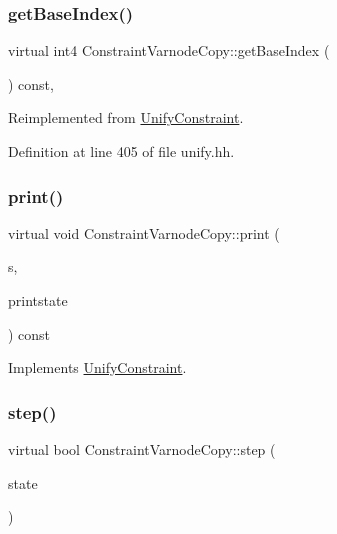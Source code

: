 \subsubsection{\texorpdfstring{getBaseIndex()}{getBaseIndex()}}
{\footnotesize\ttfamily virtual int4 Constraint\+Varnode\+Copy\+::get\+Base\+Index (\begin{DoxyParamCaption}\item[{void}]{ }\end{DoxyParamCaption}) const\hspace{0.3cm}{\ttfamily [inline]}, {\ttfamily [virtual]}}



Reimplemented from \mbox{\hyperlink{class_unify_constraint_a44f0164f38ac1fdc44fc73ebe7678de1}{Unify\+Constraint}}.



Definition at line 405 of file unify.\+hh.

\mbox{\label{class_constraint_varnode_copy_a6341d22e7011e5bba4c1ed7aa4d0b657}} 
\subsubsection{\texorpdfstring{print()}{print()}}
{\footnotesize\ttfamily virtual void Constraint\+Varnode\+Copy\+::print (\begin{DoxyParamCaption}\item[{ostream \&}]{s,  }\item[{\mbox{\hyperlink{class_unify_c_printer}{Unify\+C\+Printer}} \&}]{printstate }\end{DoxyParamCaption}) const\hspace{0.3cm}{\ttfamily [virtual]}}



Implements \mbox{\hyperlink{class_unify_constraint_a774f6a611a96384766cb8e8d8f5ff41f}{Unify\+Constraint}}.

\mbox{\label{class_constraint_varnode_copy_afa111c6ea8baf57393ba9d503612e036}} 
\subsubsection{\texorpdfstring{step()}{step()}}
{\footnotesize\ttfamily virtual bool Constraint\+Varnode\+Copy\+::step (\begin{DoxyParamCaption}\item[{\mbox{\hyperlink{class_unify_state}{Unify\+State}} \&}]{state }\end{DoxyParamCaption})\hspace{0.3cm}{\ttfamily [virtual]}}



